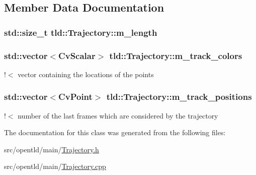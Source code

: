 \subsection{Member Data Documentation}
\hypertarget{classtld_1_1Trajectory_a116616c9feae2932359a858cf4f947a0}{
\subsubsection[{m\-\_\-length}]{\setlength{\rightskip}{0pt plus 5cm}std\-::size\-\_\-t tld\-::\-Trajectory\-::m\-\_\-length\hspace{0.3cm}{\ttfamily [private]}}}\label{classtld_1_1Trajectory_a116616c9feae2932359a858cf4f947a0}
\hypertarget{classtld_1_1Trajectory_a16024c5a1a5853ad73d5ea5626578561}{
\subsubsection[{m\-\_\-track\-\_\-colors}]{\setlength{\rightskip}{0pt plus 5cm}std\-::vector$<$Cv\-Scalar$>$ tld\-::\-Trajectory\-::m\-\_\-track\-\_\-colors\hspace{0.3cm}{\ttfamily [private]}}}\label{classtld_1_1Trajectory_a16024c5a1a5853ad73d5ea5626578561}


!$<$ vector containing the locations of the points 

\hypertarget{classtld_1_1Trajectory_aa9090109c11c57313b8fa7853e0d98fa}{
\subsubsection[{m\-\_\-track\-\_\-positions}]{\setlength{\rightskip}{0pt plus 5cm}std\-::vector$<$Cv\-Point$>$ tld\-::\-Trajectory\-::m\-\_\-track\-\_\-positions\hspace{0.3cm}{\ttfamily [private]}}}\label{classtld_1_1Trajectory_aa9090109c11c57313b8fa7853e0d98fa}


!$<$ number of the last frames which are considered by the trajectory 



The documentation for this class was generated from the following files\-:\begin{DoxyCompactItemize}
\item 
src/opentld/main/\hyperlink{Trajectory_8h}{Trajectory.\-h}\item 
src/opentld/main/\hyperlink{Trajectory_8cpp}{Trajectory.\-cpp}\end{DoxyCompactItemize}
